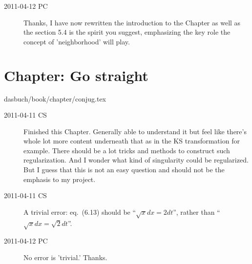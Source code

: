 \begin{description}

\item[2011-04-12 PC] Thanks, I have now rewritten the introduction to the
Chapter as well as the section 5.4 is the spirit you suggest, emphasizing
the key role the concept of 'neighborhood' will play.

\end{description}


\section{Chapter: Go straight}\noindent dasbuch/book/chapter/conjug.tex
\begin{description}

\item[2011-04-11 CS]
Finished this Chapter. Generally able to understand it but feel like
there's whole lot more content underneath that as in the KS
transformation for example. There should be a lot tricks and methods to
construct such regularization. And I wonder what kind of singularity
could be regularized. But I guess that this is not an easy question and
should not be the emphasis to my project.


\item[2011-04-11 CS]
A trivial error: eq.~(6.13) should be ``$\sqrt{x}dx = 2dt$'',
rather than ``$\sqrt{x}dx = \sqrt{2}dt$''.

\item[2011-04-12 PC]
No error is 'trivial.' Thanks.

\end{description}



